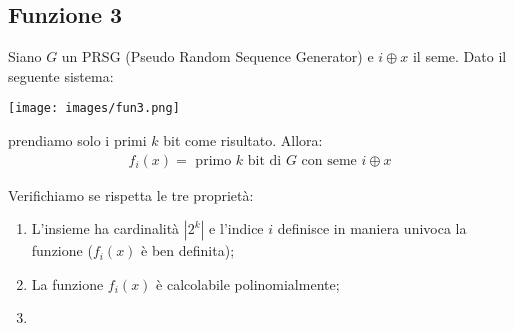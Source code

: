 \subsection{Funzione 3}
Siano $G$ un PRSG (Pseudo Random Sequence Generator) e $i \oplus x$ il seme. Dato il seguente sistema:
\begin{center}
    \texttt{[image: images/fun3.png]}
\end{center}

\noindent prendiamo solo i primi $k$ bit come risultato. Allora:
\begin{align*}
    f_i(x) = \text{ primo $k$ bit di $G$ con seme $i \oplus x$}
\end{align*}

\noindent Verifichiamo se rispetta le tre proprietà:
\begin{enumerate}
    \item L'insieme ha cardinalità $|2^k|$ e l'indice $i$ definisce in maniera univoca la funzione ($f_i(x)$ è ben definita);
    \item La funzione $f_i(x)$ è calcolabile polinomialmente;
    \item 
\end{enumerate}